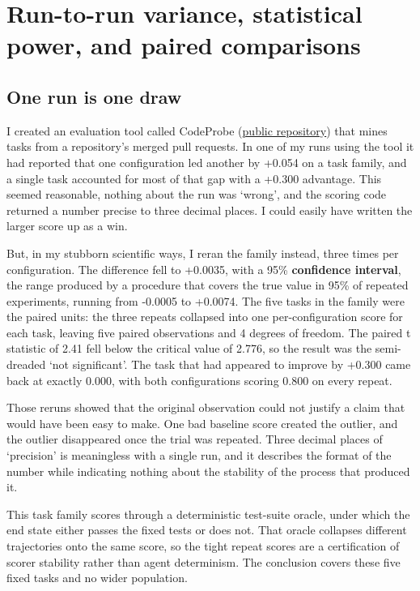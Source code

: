 \chapter{Run-to-run variance, statistical power, and paired comparisons}
\label{ch01-variance-power-paired-comparisons}
\section{One run is one draw}\label{one-run-is-one-draw}

I created an evaluation tool called CodeProbe (\href{https://github.com/sjarmak/codeprobe}{public repository}) that mines tasks from a repository's merged pull requests. In one of my runs using the tool it had reported that one configuration led another by +0.054 on a task family, and a single task accounted for most of that gap with a +0.300 advantage. This seemed reasonable, nothing about the run was `wrong', and the scoring code returned a number precise to three decimal places. I could easily have written the larger score up as a win.

But, in my stubborn scientific ways, I reran the family instead, three times per configuration. The difference fell to +0.0035, with a 95\% \textbf{confidence interval}, the range produced by a procedure that covers the true value in 95\% of repeated experiments, running from -0.0005 to +0.0074. The five tasks in the family were the paired units: the three repeats collapsed into one per-configuration score for each task, leaving five paired observations and 4 degrees of freedom. The paired t statistic of 2.41 fell below the critical value of 2.776, so the result was the semi-dreaded `not significant'. The task that had appeared to improve by +0.300 came back at exactly 0.000, with both configurations scoring 0.800 on every repeat.

Those reruns showed that the original observation could not justify a claim that would have been easy to make. One bad baseline score created the outlier, and the outlier disappeared once the trial was repeated. Three decimal places of `precision' is meaningless with a single run, and it describes the format of the number while indicating nothing about the stability of the process that produced it.

This task family scores through a deterministic test-suite oracle, under which the end state either passes the fixed tests or does not. That oracle collapses different trajectories onto the same score, so the tight repeat scores are a certification of scorer stability rather than agent determinism. The conclusion covers these five fixed tasks and no wider population.

